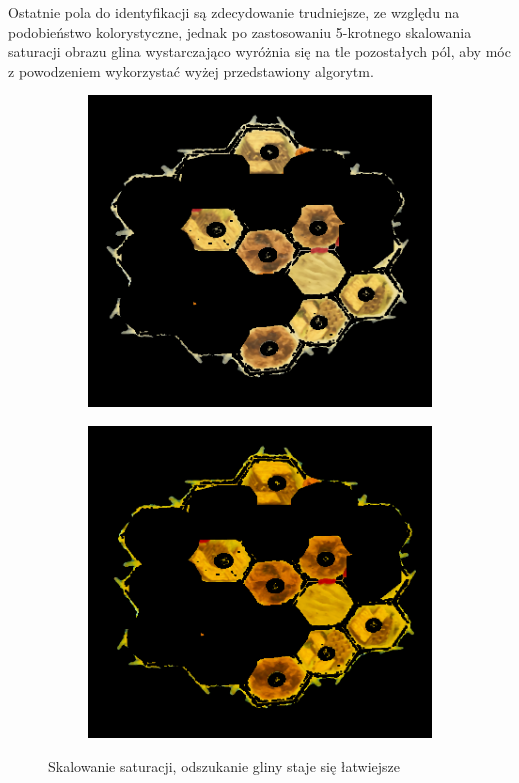 \documentclass[a4paper]{article}
\begin{document}
Ostatnie pola do identyfikacji są zdecydowanie trudniejsze, ze względu na podobieństwo kolorystyczne, jednak po zastosowaniu 5-krotnego skalowania saturacji obrazu glina wystarczająco wyróżnia się na tle pozostałych pól, aby móc z powodzeniem wykorzystać wyżej przedstawiony algorytm.

	\begin{figure}[h]
        \begin{subfigure}[]{.5\linewidth}
        \includegraphics[width=\linewidth]{pictures/fields/pre_sat.png}

        \end{subfigure}
        \begin{subfigure}[]{0.5\linewidth}
        \includegraphics[width=\linewidth]{pictures/fields/after_sat.png}
        \end{subfigure}

        \caption{Skalowanie saturacji, odszukanie gliny staje się łatwiejsze}
        \label{fig:step6}
    \end{figure}
	
\end{document}
